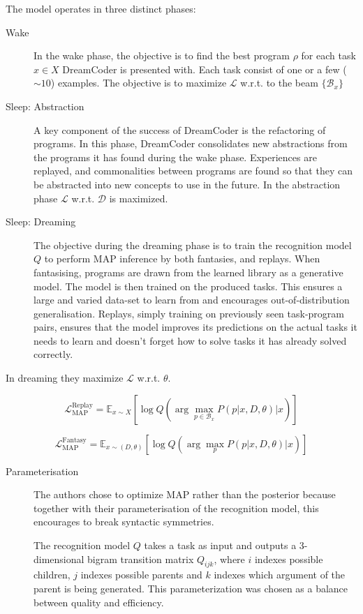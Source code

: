 The model operates in three distinct phases:

\begin{description}
    \item[Wake] In the wake phase, the objective is to find the best program $\rho$ for each task $x \in X$ DreamCoder is presented with. Each task consist of one or a few ($\sim10$) examples.
    The objective is to maximize \(\mathcal{L}\) w.r.t. to the beam \(\{\mathcal{B}_x\}\)
    \item[Sleep: Abstraction] A key component of the success of DreamCoder is the refactoring of programs. In this phase, DreamCoder consolidates new abstractions from the programs it has found during the wake phase. Experiences are replayed, and commonalities between programs are found so that they can be abstracted into new concepts to use in the future. 
    In the abstraction phase \(\mathcal{L}\) w.r.t. \(\mathcal{D}\) is maximized.
    \item[Sleep: Dreaming] The objective during the dreaming phase is to train the recognition model $Q$ to perform MAP inference by both fantasies, and replays. When fantasising, programs are drawn from the learned library as a generative model. The model is then trained on the produced tasks. This ensures a large and varied data-set to learn from and encourages out-of-distribution generalisation. Replays, simply training on previously seen task-program pairs, ensures that the model improves its predictions on the actual tasks it needs to learn and doesn't forget how to solve tasks it has already solved correctly.
\end{description}

In dreaming they maximize \(\mathcal{L}\) w.r.t. \(\theta\).

\[
    \mathcal{L}_{\text{MAP}}^{\text{Replay}} = \mathbb{E}_{x\sim X} \left[ \log Q \left( \arg\max_{p \in \mathcal{B}_x} P(p|x, D, \theta)  \Big\lvert x \right) \right]
\]

\[
    \mathcal{L}_{\text{MAP}}^{\text{Fantasy}} = \mathbb{E}_{x \sim (D, \theta)} \left[ \log Q \left( \arg\max_{p} P(p|x, D, \theta) \Big\lvert x \right) \right]  
\]

\begin{description}
    \item[Parameterisation] The authors chose to optimize MAP rather than the posterior because together with their parameterisation of the recognition model, this encourages to break syntactic symmetries.

    The recognition model \(Q\) takes a task as input and outputs a 3-dimensional bigram transition matrix \(Q_{ijk}\), where \(i\) indexes possible children, \(j\) indexes possible parents and \(k\) indexes which argument of the parent is being generated. This parameterization was chosen as a balance between quality and efficiency.
    
\end{description}

